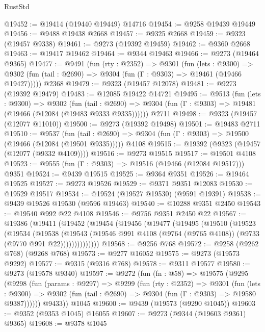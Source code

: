 \begin{lexlean}{RustStd}
\begin{coremodule}
@19452 := @19414 (@19440 @19449) @14716
@19454 := @9258 @19439 @19449
@19456 := @9488 @19438 @2668
@19457 := @9325 @2668
@19459 := @9323 (@19457 @9338)
@19461 := @9273 (@19392 @19459)
@19462 := @9360 @2668
@19463 := @19417 @19462
@19464 := @9344 @19463
@19466 := @9273 (@19464 @9365)
@19477 := @9491
    (fun (rty : @2352) =>
    @9301
      (fun (lets : @9300) =>
      @9302 (fun (tail : @2690) => @9304 (fun (Γ : @9303) => @19461 (@19466 @19427)))))
    @2368
@19479 := @9323 (@19457 @12078)
@19481 := @9273 (@19392 @19479)
@19483 := @12085 @19422 @14721
@19495 := @9513
    (fun (lets : @9300) =>
    @9302
      (fun (tail : @2690) =>
      @9304 (fun (Γ : @9303) => @19481 (@19466 (@12084 (@19483 @9333 @9335))))))
    @2711
@19498 := @9323 (@19457 (@12077 @11010))
@19500 := @9273 (@19392 @19498)
@19501 := @19483 @2711
@19510 := @9537
    (fun (tail : @2690) => @9304 (fun (Γ : @9303) => @19500 (@19466 (@12084 (@19501 @9335)))))
    @4108
@19515 := @19392 (@9323 (@19457 (@12077 (@9332 @4109))))
@19516 := @9273 @19515
@19517 := @19501 @4108
@19523 := @9555 (fun (Γ : @9303) => @19516 (@19466 (@12084 @19517))) @9351
@19524 := @9439 @19515
@19525 := @9364 @9351
@19526 := @19464 @19525
@19527 := @9273 @19526
@19529 := @9371 @9351 @12083
@19530 := @19529 @19517
@19534 := @19524 (@19527 @19530) (@9591 @19391)
@19538 := @9439 @19526 @19530 (@9596 @19463)
@19540 := @10288 @9351 @2450
@19543 := @19540 @992 @22 @4108
@19546 := @9756 @9351 @2450 @22
@19567 := @19386
    (@19411
      (@19452
        (@19454
          (@19456
            (@19477
              (@19495
                (@19510
                  (@19523
                    (@19534
                      (@19538
                        (@19543
                          (@19546
                            @991
                            @4108
                            (@9764 (@9765 @4108))
                            (@9733 (@9770 @991 @22))))))))))))))
@19568 := @9256 @768
@19572 := @9258 (@9262 @768) (@9268 @768)
@19573 := @9277 @16052
@19575 := @9273 (@19573 @9292)
@19577 := @9315 (@9316 @768)
@19578 := @9311 @19577
@19580 := @9273 (@19578 @9340)
@19597 := @9272
    (fun (fn : @58) =>
    @19575
      (@9295
        (@9298
          (fun (params : @9297) =>
          @9299
            (fun (rty : @2352) =>
            @9301
              (fun (lets : @9300) =>
              @9302 (fun (tail : @2690) => @9304 (fun (Γ : @9303) => @19580 @9387))))))
        @9433))
    @1045
@19600 := @9439 (@19573 (@9290 @1045))
@19603 := @9352 (@9353 @1045) @16055
@19607 := @9273 (@9344 (@19603 @9361) @9365)
@19608 := @9378 @1045

\end{coremodule}
\end{lexlean}
